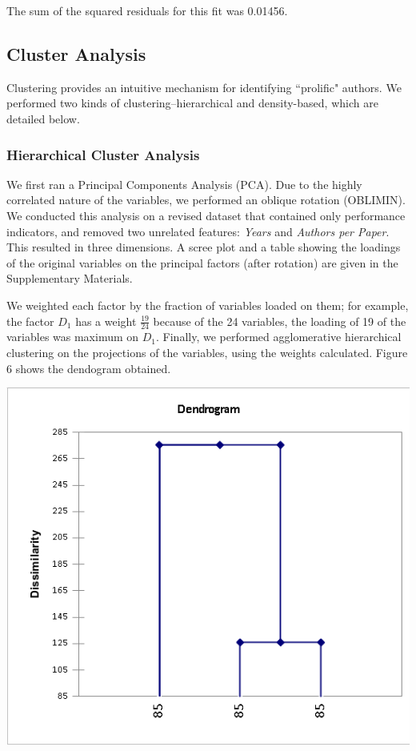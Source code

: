 \documentclass[12pt,a4paper,twocolumn]{article}
\begin{document}
	The sum of the squared residuals for this fit was 0.01456.
	
	\subsection{Cluster Analysis}
	Clustering provides an intuitive mechanism for identifying ``prolific" authors. We performed two kinds of clustering--hierarchical and density-based, which are detailed below.
	
	\subsubsection{Hierarchical Cluster Analysis}
	We first ran a Principal Components Analysis (PCA). Due to the highly correlated nature of the variables, we performed an oblique rotation (OBLIMIN). We conducted this analysis on a revised dataset that contained only performance indicators, and removed two unrelated features: \textit{Years} and \textit{Authors per Paper}. This resulted in three dimensions. A scree plot and a table showing the loadings of the original variables on the principal factors (after rotation) are given in the Supplementary Materials.
	
	We weighted each factor by the fraction of variables loaded on them; for example, the factor $D_1$ has a weight $\frac{19}{24}$ because of the 24 variables, the loading of 19 of the variables was maximum on $D_1$. Finally, we performed agglomerative hierarchical clustering on the projections of the variables, using the weights calculated. Figure 6 shows the dendogram obtained.
	
	\includegraphics[scale=0.35]{dendogram.png}
	\begingroup
	\endgroup
	\hfill\break
	
\end{document}
